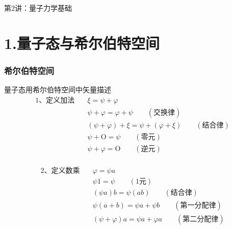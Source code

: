 

\begin{frame} [plain]
    \frametitle{}
    \Background[1] 
    \begin{center}
    {\huge 第2讲：量子力学基础}
    \end{center}  
    \addtocounter{framenumber}{-1}   
\end{frame}

\section{1.量子态与希尔伯特空间}

\begin{frame} 
    \frametitle{希尔伯特空间}
    量子态用希尔伯特空间中矢量描述\\
    \begin{equation*}
        \begin{split}
            \text{1、定义加法} \quad  &\xi=\psi+\varphi\\
            &\psi+\varphi=\varphi+\psi \qquad (\text{交换律})\\
            &(\psi+\varphi)+\xi=\psi+(\varphi+\xi) \qquad (\text{结合律})\\
            &\psi+\text{O}= \psi \qquad (\text{零元})\\
            &\psi+\varphi= \text{O} \qquad (\text{逆元})\\
        \end{split}  
    \end{equation*}
\end{frame} 

\begin{frame} 
    \begin{equation*}
        \begin{split}
            \text{2、定义数乘} \quad &\varphi=\psi a\\
            &\psi 1= \psi \qquad (\text{1元})\\
            &(\psi a)b=\psi (ab) \qquad (\text{结合律})\\
            &\psi(a+b)= \psi a+ \psi b \qquad (\text{第一分配律})\\
            &(\psi+\varphi) a= \psi a +\varphi a \qquad (\text{第二分配律})\\
        \end{split}  
    \end{equation*}
\end{frame} 

